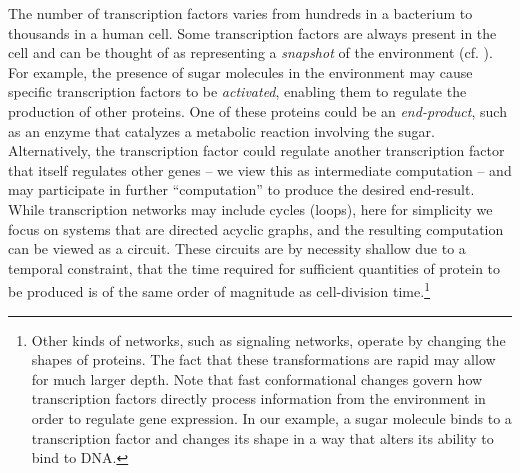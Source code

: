 \documentclass{acmtr2e}
\begin{document}
The number of transcription factors varies from hundreds in a bacterium to
thousands in a human cell. Some transcription factors are always present in the
cell and can be thought of as representing a \emph{snapshot} of the environment
(cf. ). For example, the presence of sugar molecules in the
environment may cause specific transcription factors to be \emph{activated},
enabling them to regulate the production of other proteins.  One of these
proteins could be an \emph{end-product}, such as an enzyme that catalyzes a
metabolic reaction involving the sugar. Alternatively, the transcription factor
could regulate another transcription factor that itself regulates other genes --
we view this as intermediate computation -- and may participate in further
``computation'' to produce the desired end-result.
%
While transcription networks may include cycles (loops), here for simplicity we
focus on systems that are directed acyclic graphs, and the resulting computation
can be viewed as a circuit. 
These circuits are by necessity shallow due to a temporal constraint, that the
time required for sufficient quantities of protein to be produced is of the same
order of magnitude as cell-division time.\footnote{Other kinds of networks, such
as signaling networks, operate by changing the shapes of proteins. The fact that
these transformations are rapid may allow for much larger depth. Note that fast
conformational changes govern how transcription factors directly process
information from the environment in order to regulate gene expression.  In our
example, a sugar molecule binds to a transcription factor and changes its shape
in a way that alters its ability to bind to DNA.} 
%
\end{document}
